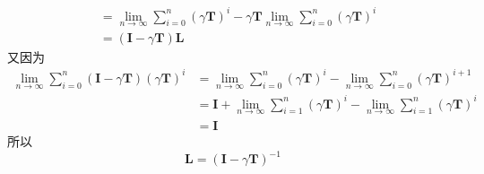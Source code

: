 \documentclass[11pt,letter,notitlepage]{article}
\begin{document}
\begin{solution}
\begin{enumerate}
\begin{enumerate}
$$\begin{aligned}
					             & =\lim_{n\rightarrow\infty}\sum_{i=0}^{n}(\gamma \mathbf{T})^i -\gamma \mathbf{T} \lim_{n\rightarrow\infty}\sum_{i=0}^{n}(\gamma \mathbf{T})^i \\
					             & = (\mathbf{I}-\gamma \mathbf{T})\mathbf{L}
				            \end{aligned}$$
			            又因为
			            $$\begin{aligned}
					            \lim_{n\rightarrow\infty}\sum_{i=0}^{n}(\mathbf{I}-\gamma \mathbf{T})(\gamma \mathbf{T})^i
					             & =\lim_{n\rightarrow\infty}\sum_{i=0}^{n}(\gamma \mathbf{T})^i -\lim_{n\rightarrow\infty}\sum_{i=0}^{n}(\gamma \mathbf{T})^{i+1}         \\
					             & =\mathbf{I}+ \lim_{n\rightarrow\infty}\sum_{i=1}^{n}(\gamma \mathbf{T})^i -\lim_{n\rightarrow\infty}\sum_{i=1}^{n}(\gamma \mathbf{T})^i \\
					             & =\mathbf{I}
				            \end{aligned}$$
			            所以 $$\mathbf{L}=(\mathbf{I}-\gamma \mathbf{T})^{-1}$$
		      \end{enumerate}
	\end{enumerate}
\end{solution}
\end{document}
